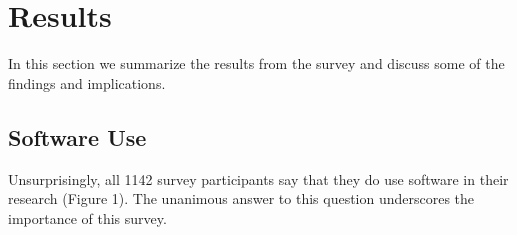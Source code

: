\section{Results}
\label{sec:res}

In this section we summarize the results from the survey and discuss some of the findings and implications.

\subsection{Software Use}
Unsurprisingly, all 1142 survey participants say that they do use software in their research (Figure 1). The unanimous answer to this question underscores the importance of this survey.